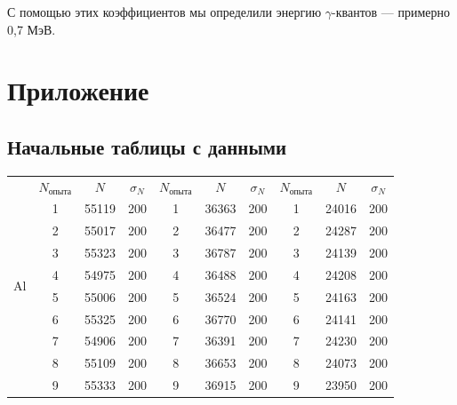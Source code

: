 \documentclass[a4paper, 12pt]{article}%
\begin{document}
С помощью этих коэффициентов мы определили энергию $\gamma$-квантов --- примерно 0,7 МэВ.
\newpage
\section*{Приложение}
\subsection*{Начальные таблицы с данными}
\begin{table}[h]
\begin{center}
\begin{tabular}{|c|c|c|c|c|c|c|c|c|c|}
\hline
\multirow{11}{*}{Al} & $N_{\text{опыта}}$ & $N$   & $\sigma_N$ & $N_{\text{опыта}}$ & $N$   & $\sigma_N$ & $N_{\text{опыта}}$ & $N$   & $\sigma_N$ \\ \cline{2-10} 
                     & 1                  & 55119 & 200        & 1                  & 36363 & 200        & 1                  & 24016 & 200        \\ \cline{2-10} 
                     & 2                  & 55017 & 200        & 2                  & 36477 & 200        & 2                  & 24287 & 200        \\ \cline{2-10} 
                     & 3                  & 55323 & 200        & 3                  & 36787 & 200        & 3                  & 24139 & 200        \\ \cline{2-10} 
                     & 4                  & 54975 & 200        & 4                  & 36488 & 200        & 4                  & 24208 & 200        \\ \cline{2-10} 
                     & 5                  & 55006 & 200        & 5                  & 36524 & 200        & 5                  & 24163 & 200        \\ \cline{2-10} 
                     & 6                  & 55325 & 200        & 6                  & 36770 & 200        & 6                  & 24141 & 200        \\ \cline{2-10} 
                     & 7                  & 54906 & 200        & 7                  & 36391 & 200        & 7                  & 24230 & 200        \\ \cline{2-10} 
                     & 8                  & 55109 & 200        & 8                  & 36653 & 200        & 8                  & 24073 & 200        \\ \cline{2-10} 
                     & 9                  & 55333 & 200        & 9                  & 36915 & 200        & 9                  & 23950 & 200        \\ \cline{2-10} 

\end{tabular}
\end{center}
\end{table}
\end{document}
